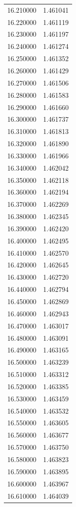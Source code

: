 \begin{tabular}{rr}
16.210000 & 1.461041 \\
16.220000 & 1.461119 \\
16.230000 & 1.461197 \\
16.240000 & 1.461274 \\
16.250000 & 1.461352 \\
16.260000 & 1.461429 \\
16.270000 & 1.461506 \\
16.280000 & 1.461583 \\
16.290000 & 1.461660 \\
16.300000 & 1.461737 \\
16.310000 & 1.461813 \\
16.320000 & 1.461890 \\
16.330000 & 1.461966 \\
16.340000 & 1.462042 \\
16.350000 & 1.462118 \\
16.360000 & 1.462194 \\
16.370000 & 1.462269 \\
16.380000 & 1.462345 \\
16.390000 & 1.462420 \\
16.400000 & 1.462495 \\
16.410000 & 1.462570 \\
16.420000 & 1.462645 \\
16.430000 & 1.462720 \\
16.440000 & 1.462794 \\
16.450000 & 1.462869 \\
16.460000 & 1.462943 \\
16.470000 & 1.463017 \\
16.480000 & 1.463091 \\
16.490000 & 1.463165 \\
16.500000 & 1.463239 \\
16.510000 & 1.463312 \\
16.520000 & 1.463385 \\
16.530000 & 1.463459 \\
16.540000 & 1.463532 \\
16.550000 & 1.463605 \\
16.560000 & 1.463677 \\
16.570000 & 1.463750 \\
16.580000 & 1.463823 \\
16.590000 & 1.463895 \\
16.600000 & 1.463967 \\
16.610000 & 1.464039 \\

\end{tabular}
